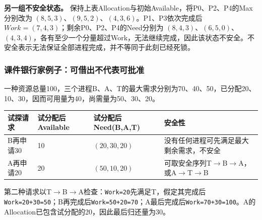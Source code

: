 \textbf{另一组不安全状态。} 保持上表Allocation与初始Available，将P0、P2、P4的Max分别改为 \((8,5,3)\)、\((9,5,2)\)、\((4,3,6)\)。P1、P3依次完成后 \(Work=(7,4,3)\)；剩余P0、P2、P4的Need分别为 \((8,4,3)\)、\((6,5,0)\)、\((4,3,4)\)，各有至少一个分量超过Work，无法继续完成，因此该状态不安全。不安全表示无法保证全部进程完成，并不等同于此刻已经死锁。

\subsubsection{课件银行家例子：可借出不代表可批准}\label{OS02-bat}

一种资源总量100，三个进程B、A、T的最大需求分别为70、40、50，已分配20、10、30，因而可用量为40，尚需量为50、30、20。

\begin{wideblock}\par\medskip\noindent\begin{minipage}{\linewidth}\fontsize{9.3}{12}\selectfont\begin{tabularx}{\linewidth}{@{}YYYY@{}}
\toprule\noalign{}
\begin{minipage}[b]{\linewidth}\raggedright
试探请求
\end{minipage} & \begin{minipage}[b]{\linewidth}\raggedright
试分配后Available
\end{minipage} & \begin{minipage}[b]{\linewidth}\raggedright
试分配后Need(B,A,T)
\end{minipage} & \begin{minipage}[b]{\linewidth}\raggedright
安全性
\end{minipage} \\
\midrule\noalign{}


B再申请30 & 10 & \((20,30,20)\) & 没有任何进程可先满足最大剩余需求，不安全 \\
A再申请20 & 20 & \((50,10,20)\) & 可取安全序列T\ensuremath{\to}B\ensuremath{\to}A，或A\ensuremath{\to}T\ensuremath{\to}B \\
\bottomrule\end{tabularx}
\end{minipage}\par\medskip\end{wideblock}

第二种请求以T\ensuremath{\to}B\ensuremath{\to}A检查：\texttt{Work=\allowbreak{}20}先满足T，假定其完成后\texttt{Work=\allowbreak{}20+\allowbreak{}30=\allowbreak{}50}；B再完成后\texttt{Work=\allowbreak{}50+\allowbreak{}20=\allowbreak{}70}；A最后完成后\texttt{Work=\allowbreak{}70+\allowbreak{}30=\allowbreak{}100}。A的Allocation已包含试分配的20，因此最后归还量为30。

